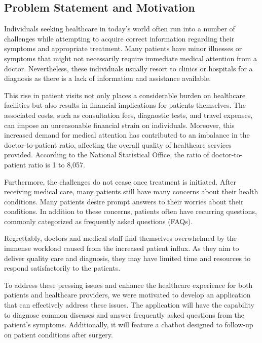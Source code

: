 \documentclass[12pt,oneside,openright,a4paper]{cpe-english-project}
\begin{document}
    \subsection{Problem Statement and Motivation}
      \qquad Individuals seeking healthcare in today's world often run into a number of challenges while attempting to acquire correct information regarding their symptoms and appropriate treatment. Many patients have minor illnesses or symptoms that might not necessarily require immediate medical attention from a doctor. Nevertheless, these individuals usually resort to clinics or hospitals for a diagnosis as there is a lack of information and assistance available. \par
      \qquad This rise in patient visits not only places a considerable burden on healthcare facilities but also results in financial implications for patients themselves. The associated costs, such as consultation fees, diagnostic tests, and travel expenses, can impose an unreasonable financial strain on individuals. Moreover, this increased demand for medical attention has contributed to an imbalance in the doctor-to-patient ratio, affecting the overall quality of healthcare services provided. According to the National Statistical Office, the ratio of doctor-to-patient ratio is 1 to 8,057\cite{NSODashboard}.\par
      \qquad Furthermore, the challenges do not cease once treatment is initiated. After receiving medical care, many patients still have many concerns about their health conditions. Many patients desire prompt answers to their worries about their conditions. In addition to these concerns, patients often have recurring questions, commonly categorized as frequently asked questions (FAQs).\par
      \qquad Regrettably, doctors and medical staff find themselves overwhelmed by the immense workload caused from the increased patient influx. As they aim to deliver quality care and diagnosis, they may have limited time and resources to respond satisfactorily to the patients.\par
      \qquad To address these pressing issues and enhance the healthcare experience for both patients and healthcare providers, we were motivated to develop an application that can effectively address these issues. The application will have the capability to diagnose common diseases and answer frequently asked questions from the patient's symptoms. Additionally, it will feature a chatbot designed to follow-up on patient conditions after surgery.\par
\end{document}
